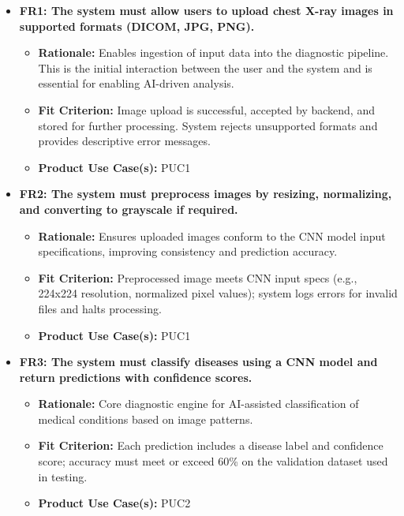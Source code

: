 \documentclass[12pt]{article}
\begin{document}
\begin{itemize}
    \item \textbf{FR1: The system must allow users to upload chest X-ray images in supported formats (DICOM\cite{dicom}, JPG, PNG).}
    \begin{itemize}
        \item \textbf{Rationale:} Enables ingestion of input data into the diagnostic pipeline. This is the initial interaction between the user and the system and is essential for enabling AI-driven analysis.
        \item \textbf{Fit Criterion:} Image upload is successful, accepted by backend, and stored for further processing. System rejects unsupported formats and provides descriptive error messages.
        \item \textbf{Product Use Case(s):} PUC1
    \end{itemize}

    \item \textbf{FR2: The system must preprocess images by resizing, normalizing, and converting to grayscale if required.}
    \begin{itemize}
        \item \textbf{Rationale:} Ensures uploaded images conform to the CNN model input specifications, improving consistency and prediction accuracy.
        \item \textbf{Fit Criterion:} Preprocessed image meets CNN input specs (e.g., 224x224 resolution, normalized pixel values); system logs errors for invalid files and halts processing.
        \item \textbf{Product Use Case(s):} PUC1
    \end{itemize}

    \item \textbf{FR3: The system must classify diseases using a CNN model and return predictions with confidence scores.}
    \begin{itemize}
        \item \textbf{Rationale:} Core diagnostic engine for AI-assisted classification of medical conditions based on image patterns.
        \item \textbf{Fit Criterion:} Each prediction includes a disease label and confidence score; accuracy must meet or exceed 60\% on the validation dataset used in testing.
        \item \textbf{Product Use Case(s):} PUC2
    \end{itemize}


\end{itemize}
\end{document}
